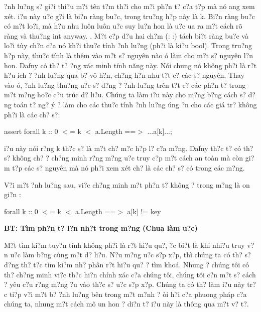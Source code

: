 \documentclass{article} %
\begin{document}
{\DJ}?nh lu?ng s? gi?i thi?u m?t t\^{e}n t?m th?i cho m?i ph?n t? c?a t?p m\`{a} n\'{o} {\dj}ang xem x\'{e}t. {\DJ}i?u n\`{a}y {\dj}u?c g?i l\`{a} bi?n r\`{a}ng bu?c, trong tru?ng h?p n\`{a}y l\`{a} k. Bi?n r\`{a}ng bu?c c\'{o} m?t lo?i, m\`{a} h?u nhu lu\^{o}n lu\^{o}n {\dj}u?c suy lu?n hon l\`{a} {\dj}u?c {\dj}ua ra m?t c\'{a}ch r\~{o} r\`{a}ng v\`{a} thu?ng int anyway. . M?t c?p d?u hai ch?m (: :) t\'{a}ch bi?t r\`{a}ng bu?c v\`{a} lo?i t\`{u}y ch?n c?a n\'{o} kh?i thu?c t\'{i}nh {\dj}?nh lu?ng (ph?i l\`{a} ki?u bool). Trong tru?ng h?p n\`{a}y, thu?c t\'{i}nh l\`{a} th\^{e}m v\`{a}o m?t s? nguy\^{e}n n\`{a}o {\dj}\'{o} l\`{a}m cho m?t s? nguy\^{e}n l?n hon. Dafny c\'{o} th? t? {\dj}?ng x\'{a}c minh t\'{i}nh n\u{a}ng n\`{a}y. N\'{o}i chung n\'{o} kh\^{o}ng ph?i l\`{a} r?t h?u \'{i}ch {\dj}? {\dj}?nh lu?ng qua b? v\^{o} h?n, ch?ng h?n nhu t?t c? c\'{a}c s? nguy\^{e}n. Thay v\`{a}o {\dj}\'{o}, {\dj}?nh lu?ng thu?ng {\dj}u?c s? d?ng {\dj}? {\dj}?nh lu?ng tr\^{e}n t?t c? c\'{a}c ph?n t? trong m?t m?ng ho?c c?u tr\'{u}c d? li?u. Ch\'{u}ng ta l\`{a}m {\dj}i?u n\`{a}y cho m?ng b?ng c\'{a}ch s? d?ng to\'{a}n t? ng? \'{y} {\dj}? l\`{a}m cho c\'{a}c thu?c t\'{i}nh {\dj}?nh lu?ng {\dj}\'{u}ng {\dj}?n cho c\'{a}c gi\'{a} tr? kh\^{o}ng ph?i l\`{a} c\'{a}c ch? s?:

\noindent   assert forall k :: 0 $<$= k $<$ a.Length ==$>$ ...a[k]...;

\noindent 

{\DJ}i?u n\`{a}y n\'{o}i r?ng k th?c s? l\`{a} m?t ch? m?c h?p l? c?a m?ng. Dafny th?c t? c\'{o} th? s? kh\^{o}ng ch? {\dj}? ch?ng minh r?ng m?ng {\dj}u?c truy c?p m?t c\'{a}ch an to\`{a}n m\`{a} c\`{o}n gi?m t?p c\'{a}c s? nguy\^{e}n m\`{a} n\'{o} ph?i xem x\'{e}t ch? l\`{a} c\'{a}c ch? s? c\'{o} trong c\'{a}c m?ng.

\noindent V?i m?t {\dj}?nh lu?ng sau, vi?c ch?ng minh m?t ph?n t? kh\^{o}ng ? trong m?ng l\`{a} {\dj}on gi?n :

\noindent forall k :: 0 $<$= k $<$ a.Length ==$>$ a[k] != key

\noindent 

\noindent \textbf{BT: T\`{i}m ph?n t? l?n nh?t trong m?ng (Chua l\`{a}m {\dj}u?c)}

M?t t\`{i}m ki?m tuy?n t\'{i}nh kh\^{o}ng ph?i l\`{a} r?t hi?u qu?, {\dj}?c bi?t l\`{a} khi nhi?u truy v?n {\dj}u?c l\`{a}m b?ng c\`{u}ng m?t d? li?u. N?u m?ng {\dj}u?c s?p x?p, th\`{i} ch\'{u}ng ta c\'{o} th? s? d?ng th? t?c t\`{i}m ki?m nh? ph\^{a}n r?t hi?u qu? {\dj}? t\`{i}m kho\'{a}. Nhung {\dj}? ch\'{u}ng t\^{o}i c\'{o} th? ch?ng minh vi?c th?c hi?n ch\'{i}nh x\'{a}c c?a ch\'{u}ng t\^{o}i, ch\'{u}ng t\^{o}i c?n m?t s? c\'{a}ch {\dj}? y\^{e}u c?u r?ng m?ng {\dj}?u v\`{a}o th?c s? {\dj}u?c s?p x?p. Ch\'{u}ng ta c\'{o} th? l\`{a}m {\dj}i?u n\`{a}y tr?c ti?p v?i m?t b? {\dj}?nh lu?ng b\^{e}n trong m?t m?nh {\dj}? {\dj}\`{o}i h?i c?a phuong ph\'{a}p c?a ch\'{u}ng ta, nhung m?t c\'{a}ch m\^{o} {\dj}un hon {\dj}? di?n t? {\dj}i?u n\`{a}y l\`{a} th\^{o}ng qua m?t v? t?.
\end{document}
